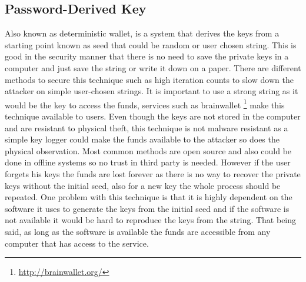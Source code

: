 \subsection{Password-Derived Key} 
Also known as deterministic wallet, is a system that derives the keys from a starting point known as seed that could be random or user chosen string. This is good in the security manner that there is no need to save the private keys in a computer and just save the string or write it down on a paper. There are different methods to secure this technique such as high iteration counts to slow down the attacker on simple user-chosen strings. It is important to use a strong string as it would be the key to access the funds, services such as brainwallet \footnote{\url{http://brainwallet.org/}} make this technique available to users. Even though the keys are not stored in the computer and are resistant to physical theft, this technique is not malware resistant as a simple key logger could make the funds available to the attacker so does the physical observation. Most common methods are open source and also could be done in offline systems so no trust in third party is needed. However if the user forgets his keys the funds are lost forever as there is no way to recover the private keys without the initial seed, also for a new key the whole process should be repeated. One problem with this technique is that it is highly dependent on the software it uses to generate the keys from the initial seed and if the software is not available it would be hard to reproduce the keys from the string. That being said, as long as the software is available the funds are accessible from any computer that has access to the service. 


